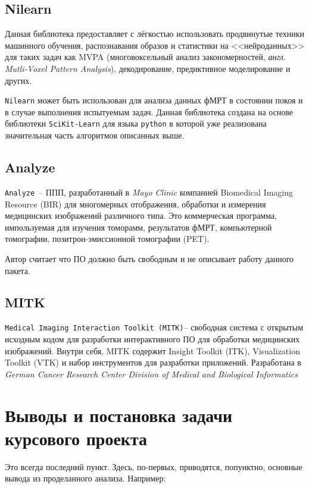 \subsection{Nilearn}
Данная библиотека предоставляет с лёгкостью использовать продвинутые техники машинного обучения, распознавания образов и статистики на <<нейроданных>> для таких задач как MVPA (многовоксельный анализ закономерностей, \textit{англ. Mutli-Voxel Pattern Analysis}), декодирование, предиктивное моделирование и других.

\texttt{Nilearn} может быть использован для анализа данных фМРТ в состоянии покоя и в случае выполнения испытуемым задач. Данная библиотека создана на основе библиотеки \texttt{SciKit-Learn} для языка \texttt{python} в которой уже реализована значительная часть алгоритмов описанных выше.

\subsection{Analyze}
\texttt{Analyze}~-- ППП, разработанный в \textit{Mayo Clinic} компанией Biomedical Imaging Resource (BIR) для многомерных отображения, обработки и измерения медицинских изображений различного типа. Это коммерческая программа, импользуемая для изучения томорамм, результатов фМРТ, компьютерной томографии, позитрон-эмиссионной томографии (PET).

Автор считает что ПО должно быть свободным и не описывает работу данного пакета.

\subsection{MITK}
\texttt{Medical Imaging Interaction Toolkit (MITK)}-- свободная система с открытым исходным кодом для разработки интерактивного
ПО для обработки медицинских изображений. Внутри себя, MITK содержит Insight Toolkit (ITK), Visualization Toolkit (VTK) и набор инструментов для разработки приложений. Разработана в \textit{German Cancer Research Center
Division of Medical and Biological Informatics}


\section{Выводы и постановка задачи курсового проекта}

Это всегда последний пункт. Здесь, по-первых, приводятся, попунктно, основные вывода из проделанного анализа. Например:

